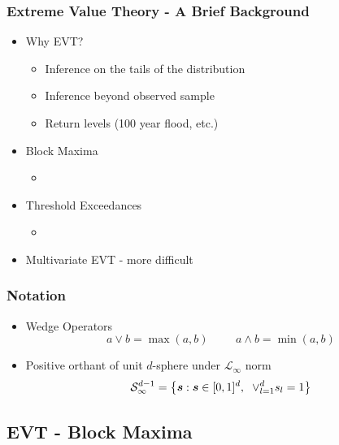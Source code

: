 \documentclass[aspectratio=169]{beamer}
\begin{document}
\begin{frame}
  \frametitle{Extreme Value Theory - A Brief Background}
  \begin{itemize}
    \item Why EVT?
        \begin{itemize}
            \item Inference on the tails of the distribution
            \item Inference beyond observed sample
            \item Return levels (100 year flood, etc.)
        \end{itemize}
    \item Block Maxima
        \begin{itemize}
            \item \citet{frechet1927,fisher1928,gumbel1942,jenkinson1955}
        \end{itemize}
    \item Threshold Exceedances
        \begin{itemize}
            \item \citet{pickands1975,balkema1974}
        \end{itemize}
    \item Multivariate EVT - more difficult
  \end{itemize}
\end{frame} %
\begin{frame}
    \frametitle{Notation}
    \begin{itemize}
      \item Wedge Operators
        \begin{equation*}
            a \vee b = \max(a,b) \hspace{1cm} a\wedge b = \min(a,b)
        \end{equation*}
      \item Positive orthant of unit $d$-sphere under $\mathcal{L}_{\infty}$ norm
        \begin{equation*}
          \mathcal{S}_{\infty}^{d-1} = \left\lbrace \bm{s} : \bm{s} \in [0,1]^d,\hspace{0.2cm}
                            \vee_{l=1}^d s_l = 1\right\rbrace
        \end{equation*}
    \end{itemize}
    
\end{frame} %

\subsection{EVT - Block Maxima}
\end{document}
